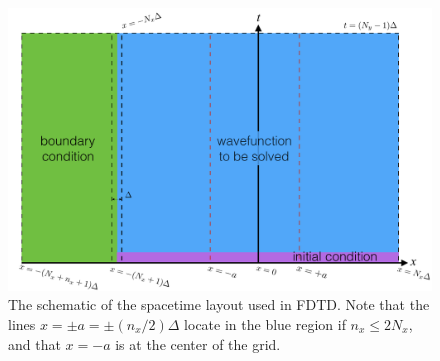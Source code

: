 \documentclass[final,1p,times]{elsarticle}
\begin{document}

\begin{figure}[h]
	\centering
	\includegraphics[scale=0.6]{FDTD_schematic}
	\caption{The schematic of the spacetime layout used in FDTD. Note that the lines $x=\pm a=\pm (n_x/2)\Delta$ locate in the blue region if $n_x\leq2N_x$, and that $x=-a$ is at the center of the grid.}
	\label{fig:FDTD_schematic}
\end{figure}
\end{document}
